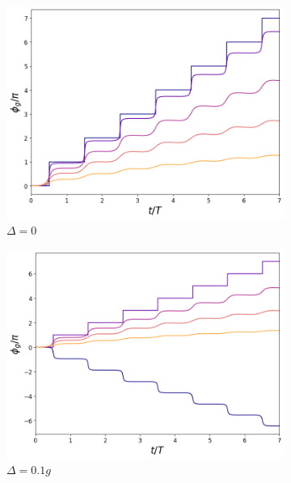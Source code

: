 \begin{figure}[H]
    \centering
    \begin{subfigure}{0.49\textwidth}
        \centering
        \includegraphics[width=\textwidth]{figuras/ch3/fg kerr.png}
        \caption{$\Delta=0$}
        \label{fig3:fg kerr 1}
    \end{subfigure}
    \hfill
    \begin{subfigure}{0.49\textwidth}
        \centering
        \includegraphics[width=\textwidth]{figuras/ch3/fg kerr d=0.1g.png}
        \caption{$\Delta=0.1g$}
        \label{fig3:fg kerr 2}
    \end{subfigure}
    \caption{}
\end{figure}
